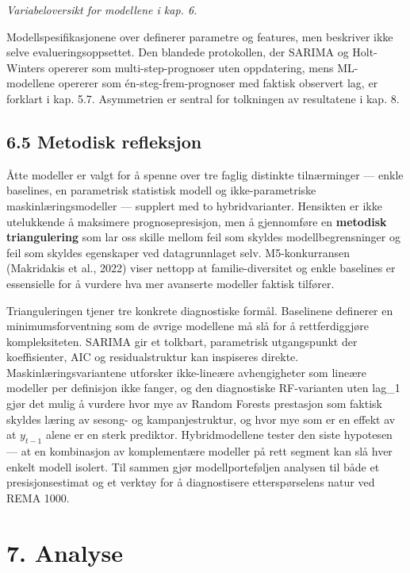 \documentclass[
  norsk,
  11pt,
  a4paper,
]{article}
\begin{document}
\emph{Variabeloversikt for modellene i kap. 6.}

Modellspesifikasjonene over definerer parametre og features, men
beskriver ikke selve evalueringsoppsettet. Den blandede protokollen, der
SARIMA og Holt-Winters opererer som multi-step-prognoser uten
oppdatering, mens ML-modellene opererer som én-steg-frem-prognoser med
faktisk observert lag, er forklart i kap. 5.7. Asymmetrien er sentral
for tolkningen av resultatene i kap. 8.

\subsection{6.5 Metodisk refleksjon}\label{metodisk-refleksjon}

Åtte modeller er valgt for å spenne over tre faglig distinkte
tilnærminger --- enkle baselines, en parametrisk statistisk modell og
ikke-parametriske maskinlæringsmodeller --- supplert med to
hybridvarianter. Hensikten er ikke utelukkende å maksimere
prognosepresisjon, men å gjennomføre en \textbf{metodisk triangulering}
som lar oss skille mellom feil som skyldes modellbegrensninger og feil
som skyldes egenskaper ved datagrunnlaget selv. M5-konkurransen
(Makridakis et al., 2022) viser nettopp at familie-diversitet og enkle
baselines er essensielle for å vurdere hva mer avanserte modeller
faktisk tilfører.

Trianguleringen tjener tre konkrete diagnostiske formål. Baselinene
definerer en minimumsforventning som de øvrige modellene må slå for å
rettferdiggjøre kompleksiteten. SARIMA gir et tolkbart, parametrisk
utgangspunkt der koeffisienter, AIC og residualstruktur kan inspiseres
direkte. Maskinlæringsvariantene utforsker ikke-lineære avhengigheter
som lineære modeller per definisjon ikke fanger, og den diagnostiske
RF-varianten uten lag\_1 gjør det mulig å vurdere hvor mye av Random
Forests prestasjon som faktisk skyldes læring av sesong- og
kampanjestruktur, og hvor mye som er en effekt av at \(y_{t-1}\) alene
er en sterk prediktor. Hybridmodellene tester den siste hypotesen --- at
en kombinasjon av komplementære modeller på rett segment kan slå hver
enkelt modell isolert. Til sammen gjør modellporteføljen analysen til
både et presisjonsestimat og et verktøy for å diagnostisere
etterspørselens natur ved REMA 1000.

\section{7. Analyse}\label{analyse}
\end{document}
